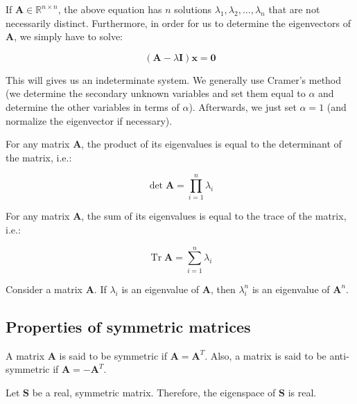 \documentclass[12pt]{article}
\DeclareMathOperator{\tr}{Tr}
\begin{document}
If $\mathbf{A} \in \mathbb{R}^{n \times n}$, the above equation has $n$ solutions $\lambda_1, \lambda_2, \dots, \lambda_n$ that are not necessarily distinct. Furthermore, in order for us to determine the eigenvectors of $\mathbf{A}$, we simply have to solve:

\[ (\mathbf{A} - \lambda\mathbf{I})\mathbf{x} = \mathbf{0} \]

This will gives us an indeterminate system. We generally use Cramer's method (we determine the secondary unknown variables and set them equal to $\alpha$ and determine the other variables in terms of $\alpha$). Afterwards, we just set $\alpha = 1$ (and normalize the eigenvector if necessary).

\begin{theorem}
    For any matrix $\mathbf{A}$, the product of its eigenvalues is equal to the determinant of the matrix, i.e.:

    \[ \det{\mathbf{A}} = \prod_{i = 1}^n \lambda_i \]
\end{theorem}

\begin{theorem}
    For any matrix $\mathbf{A}$, the sum of its eigenvalues is equal to the trace of the matrix, i.e.:

    \[ \tr{\mathbf{A}} = \sum_{i = 1}^n \lambda_i \]
\end{theorem}

\begin{theorem}
    Consider a matrix $\mathbf{A}$. If $\lambda_i$ is an eigenvalue of $\mathbf{A}$, then $\lambda_i^n$ is an eigenvalue of $\mathbf{A}^n$.
\end{theorem}

\newpage

\subsection{Properties of symmetric matrices}

\begin{definition}
    A matrix $\mathbf{A}$ is said to be symmetric if $\mathbf{A} = \mathbf{A}^T$. Also, a matrix is said to be anti-symmetric if $\mathbf{A} = -\mathbf{A}^T$.
\end{definition}

\begin{theorem}
    Let $\mathbf{S}$ be a real, symmetric matrix. Therefore, the eigenspace of $\mathbf{S}$ is real.
\end{theorem}
\end{document}
